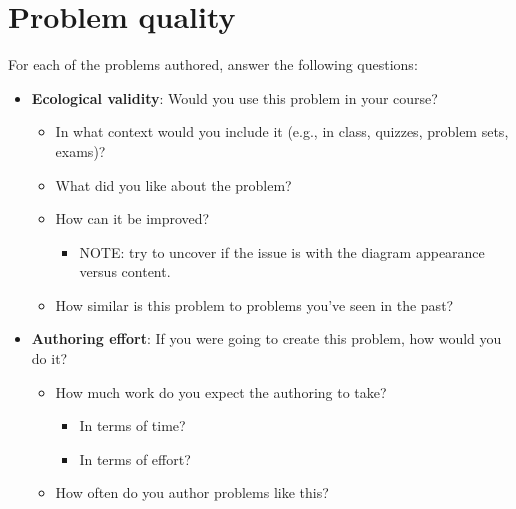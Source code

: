 \section*{Problem quality}
For each of the problems authored, answer the following questions:
\begin{itemize}
    \item \textbf{Ecological validity}: Would you use this problem in your course?
    \begin{itemize}
        \item In what context would you include it (e.g., in class, quizzes, problem sets, exams)?
        \item What did you like about the problem?
        \item How can it be improved? 
        \begin{itemize}
            \item NOTE: try to uncover if the issue is with the diagram appearance versus content.
        \end{itemize}
        \item How similar is this problem to problems you've seen in the past?
    \end{itemize}
    \item \textbf{Authoring effort}: If you were going to create this problem, how would you do it?
    \begin{itemize}
        \item How much work do you expect the authoring to take?
        \begin{itemize}
            \item In terms of time?
            \item In terms of effort?
        \end{itemize}
        \item How often do you author problems like this?
    \end{itemize}
\end{itemize}